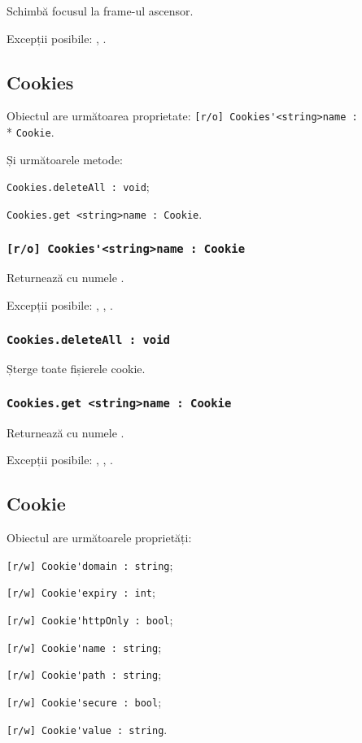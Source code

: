 Schimbă focusul la frame-ul ascensor.

Excepții posibile: , .

\subsection{{\color{orange} Cookies}}

Obiectul \cookies{} are următoarea proprietate: \lstinline|[r/o] Cookies'<string>name :|\\* \lstinline|Cookie|.

Și următoarele metode: 
\begin{icItems}
	\item \lstinline|Cookies.deleteAll : void|;
	\item \lstinline|Cookies.get <string>name : Cookie|.
\end{icItems}

\subsubsection{\lstinline|[r/o] Cookies'<string>name : Cookie|}

Returnează \cookie{} cu numele .

Excepții posibile: , , .

\subsubsection{\lstinline|Cookies.deleteAll : void|}

Șterge toate fișierele cookie.

\subsubsection{\lstinline|Cookies.get <string>name : Cookie|}

Returnează \cookie{} cu numele .

Excepții posibile: , , .

\subsection{{\color{orange} Cookie}}

Obiectul \cookie{} are următoarele proprietăți:
\begin{icItems}
	\item \lstinline|[r/w] Cookie'domain : string|;
	\item \lstinline|[r/w] Cookie'expiry : int|;
	\item \lstinline|[r/w] Cookie'httpOnly : bool|;
	\item \lstinline|[r/w] Cookie'name : string|;
	\item \lstinline|[r/w] Cookie'path : string|;
	\item \lstinline|[r/w] Cookie'secure : bool|;
	\item \lstinline|[r/w] Cookie'value : string|.
\end{icItems}

